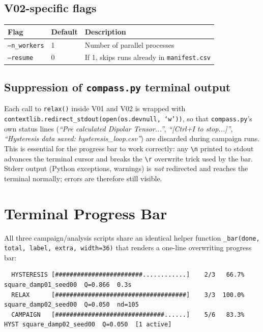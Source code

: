\documentclass[11pt,a4paper]{article}
\newcommand{\code}[1]{\texttt{#1}}
\newcommand{\param}[1]{\texttt{--#1}}
\begin{document}
\subsection{V02-specific flags}

\begin{tabular}{p{3.5cm}p{2.2cm}p{9cm}}
\toprule
Flag & Default & Description \\
\midrule
\param{n\_workers} & 1 & Number of parallel processes \\
\param{resume} & 0 & If 1, skips runs already in \texttt{manifest.csv} \\
\bottomrule
\end{tabular}

\subsection{Suppression of \texttt{compass.py} terminal output}

Each call to \code{relax()} inside V01 and V02 is wrapped with
\code{contextlib.redirect\_stdout(open(os.devnull,~`w'))}, so that
\texttt{compass.py}'s own status lines
(\textit{``Pre calculated Dipolar Tensor...''},
\textit{``[Ctrl+I to stop...]''},
\textit{``Hysteresis data saved: hysteresis\_loop.csv''})
are discarded during campaign runs.
This is essential for the progress bar to work correctly: any
\texttt{\textbackslash n} printed to stdout advances the terminal cursor and
breaks the \texttt{\textbackslash r} overwrite trick used by the bar.
Stderr output (Python exceptions, warnings) is \textit{not} redirected and
reaches the terminal normally; errors are therefore still visible.

\section{Terminal Progress Bar}
\label{sec:progressbar}

All three campaign/analysis scripts share an identical helper function
\code{\_bar(done, total, label, extra, width=36)} that renders a
one-line overwriting progress bar:

\begin{lstlisting}
  HYSTERESIS [########################............]    2/3   66.7%  square_damp01_seed00  Q=0.866  0.3s
  RELAX      [####################################]    3/3  100.0%  square_damp02_seed00  Q=0.050  nd=105
  CAMPAIGN   [##############################......]    5/6   83.3%  HYST square_damp02_seed00  Q=0.050  [1 active]
\end{lstlisting}
\end{document}
